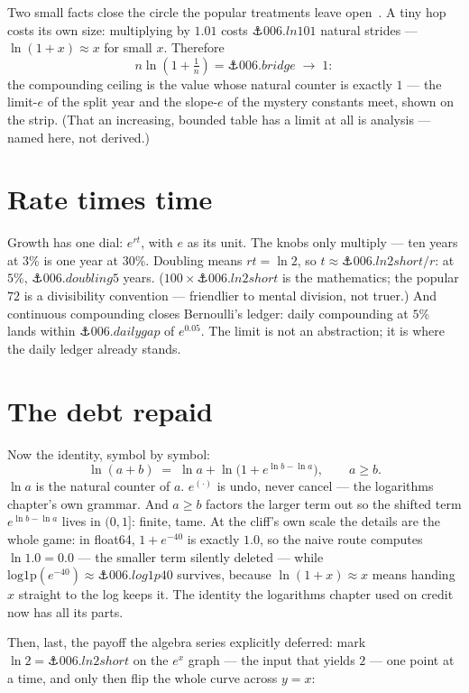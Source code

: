 \begin{narrative}
Two small facts close the circle the popular treatments leave
open~\cite{calculus-strang-introducing-e-x-mit}. A tiny hop costs its
own size: multiplying by $1.01$ costs $\anchor{006.ln101}$ natural
strides — $\ln(1+x) \approx x$ for small $x$. Therefore
\[
  n \ln\!\left(1 + \tfrac{1}{n}\right)
  = \anchor{006.bridge} \;\to\; 1 :
\]
the compounding ceiling is the value whose natural counter is exactly
$1$ — the limit-$e$ of the split year and the slope-$e$ of the mystery
constants meet, shown on the strip. (That an increasing, bounded table
has a limit at all is analysis — named here, not derived.)

\section{Rate times time}

Growth has one dial: $e^{rt}$, with $e$ as its unit. The knobs only
multiply — ten years at $3\%$ is one year at $30\%$. Doubling means
$rt = \ln 2$, so $t \approx \anchor{006.ln2short}/r$: at $5\%$,
$\anchor{006.doubling5}$ years. ($100 \times \anchor{006.ln2short}$
is the mathematics; the popular $72$ is a divisibility convention —
friendlier to mental division, not truer.) And continuous compounding closes Bernoulli's
ledger: daily compounding at $5\%$ lands within $\anchor{006.dailygap}$
of $e^{0.05}$. The limit is not an abstraction; it is where the daily
ledger already stands.

\section{The debt repaid}

Now the identity, symbol by symbol:
\[
  \ln(a+b) \;=\; \ln a + \ln\!\bigl(1 + e^{\ln b - \ln a}\bigr),
  \qquad a \ge b .
\]
$\ln a$ is the natural counter of $a$. $e^{(\cdot)}$ is undo, never
cancel — the logarithms chapter's own grammar. And $a \ge b$ factors
the larger term out so the shifted term $e^{\ln b - \ln a}$ lives in
$(0, 1]$: finite, tame. At the cliff's own scale the details are the
whole game: in float64, $1 + e^{-40}$ is exactly $1.0$, so the naive
route computes $\ln 1.0 = 0.0$ — the smaller term silently deleted —
while $\mathrm{log1p}(e^{-40}) \approx \anchor{006.log1p40}$
survives, because $\ln(1+x) \approx x$ means handing $x$ straight to
the log keeps it. The identity the logarithms chapter used on credit
now has all its parts.

Then, last, the payoff the algebra series explicitly deferred: mark
$\ln 2 = \anchor{006.ln2short}$ on the $e^x$ graph — the input that
yields $2$ — one point at a time, and only then flip the whole curve
across $y = x$:


\end{narrative}
